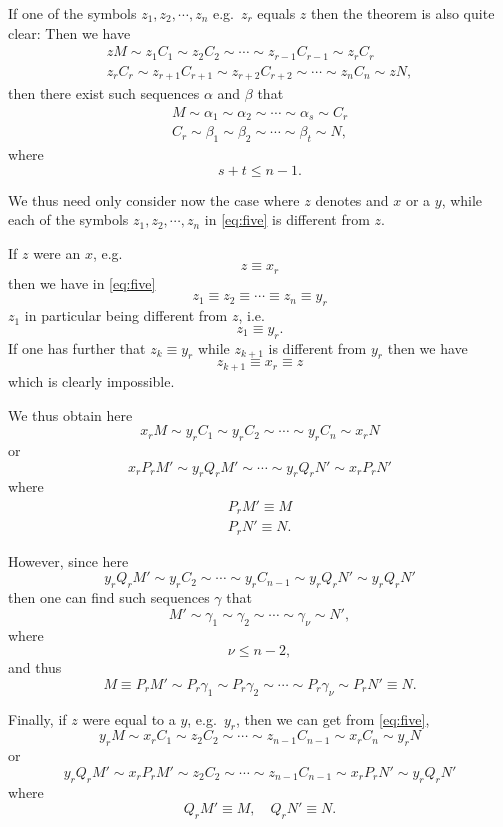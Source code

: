 
If one of the symbols $z_1,z_2,\cdots,z_n$ e.g.\ $z_r$ equals $z$ then
the theorem is also quite clear:
Then we have
\begin{gather*}
zM \sim z_1C_1 \sim z_2C_2 \sim \cdots \sim z_{r-1}C_{r-1} \sim z_rC_r \\
z_rC_r \sim z_{r+1}C_{r+1} \sim z_{r+2}C_{r+2} \sim
\cdots \sim z_nC_n \sim zN, 
\end{gather*}
then 
there exist such sequences $\alpha$ and $\beta$ that
\begin{gather*}
M \sim \alpha_1 \sim \alpha_2 \sim \cdots \sim \alpha_s \sim C_r\\
C_r \sim \beta_1 \sim \beta_2 \sim \cdots \sim \beta_t \sim N,
\end{gather*}
where
$$s+t \leq n-1.$$

We thus need only consider now the case where $z$ denotes and $x$ or a
$y$, while each of the symbols $z_1,z_2,\cdots,z_n$ in \eqref{eq:five} is
different from $z$.

If 
$z$ were an $x$, e.g.
$$z \equiv x_r$$
then we have in \eqref{eq:five}
$$z_1 \equiv z_2 \equiv \cdots \equiv z_n \equiv y_r$$
$z_1$ in particular being different from $z$, i.e.\
$$z_1 \equiv y_r.$$
If one has further that $z_k \equiv y_r$ while $z_{k+1}$ is different
from $y_r$ then we have
$$z_{k+1} \equiv x_r \equiv z$$
which is clearly impossible.

We thus obtain here
$$x_rM \sim y_rC_1 \sim y_rC_2 \sim \cdots \sim y_rC_n \sim x_rN$$
or
$$x_rP_rM' \sim y_rQ_rM'  \sim \cdots \sim y_rQ_rN' \sim x_rP_rN'$$
where
\begin{gather*}
P_rM' \equiv M\\
P_rN' \equiv N.
\end{gather*}

However, since here 
$$y_rQ_rM'  \sim y_rC_2 \sim \cdots \sim y_rC_{n-1} \sim y_rQ_rN' \sim y_rQ_rN'$$
then one can find such sequences $\gamma$ that
$$M' \sim \gamma_1 \sim \gamma_2 \sim \cdots \sim \gamma_\nu \sim
N',$$
where $$\nu \leq n-2,$$
and thus
$$M \equiv P_rM' \sim P_r\gamma_1 \sim  P_r\gamma_2 \sim \cdots \sim  P_r\gamma_\nu \sim
 P_rN' \equiv N.$$

Finally, 
if  $z$ were equal to a $y$, e.g.\ $y_r$, then we can get from
\eqref{eq:five},
$$y_rM \sim x_rC_1 \sim z_2C_2 \sim \cdots \sim z_{n-1}C_{n-1}
\sim x_rC_n \sim y_rN$$
or
$$y_rQ_rM' \sim x_rP_rM' \sim z_2C_2 \sim \cdots \sim z_{n-1}C_{n-1}
\sim x_rP_rN' \sim y_rQ_rN'$$
where
$$Q_rM' \equiv M, \quad Q_rN' \equiv N.$$

